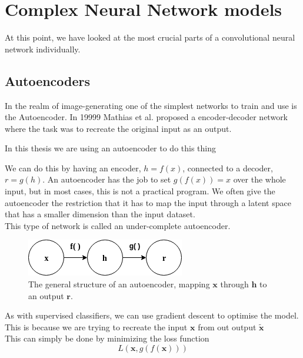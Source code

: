 \section{Complex Neural Network models}
At this point, we have looked at the most crucial parts of a convolutional neural network individually.

\subsection{Autoencoders}
\label{Explaining_autoencoders}
In the realm of image-generating one of the simplest networks to train and use is the Autoencoder.
In 19999 Mathias et al.  proposed a encoder-decoder network where the task was to recreate the original input as an output. 

In this thesis we are using an autoencoder to do this thing 


We can do this by having an encoder, $h=f(x)$, connected to a decoder, $r=g(h)$. 
An autoencoder has the job to set $g(f(x))=x$ over the whole input, but in most cases, this is not a practical program. We often give the autoencoder the restriction
that it has to map the input through a latent space that has a smaller dimension than the input dataset.\\
This type of network is called an under-complete autoencoder.\\
\vspace{10px}
\begin{figure}[ht!]
    \centering
    \includegraphics[scale=0.5]{background/figures/SimpleAE.png}
    \caption{The general structure of an autoencoder, mapping $\textbf{x}$ through $\textbf{h}$ to an output $\textbf{r}$.}
\end{figure}

As with supervised classifiers, we can use gradient descent to optimise the model. This is because we are trying to recreate the input $\textbf{x}$ from out output $\widetilde{\textbf{x}}$\\
      
This can simply be done by minimizing the loss function\\
\begin{equation}
    L(\textbf{x},g(f(\textbf{x})))
\end{equation}

